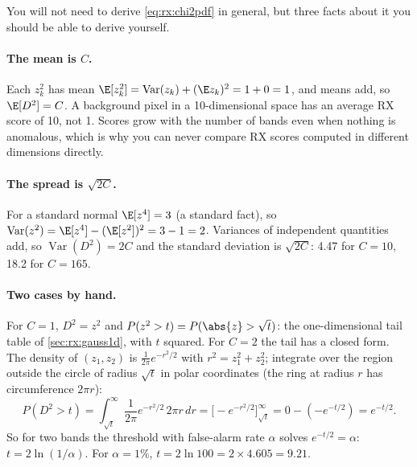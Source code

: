 You will not need to derive \cref{eq:rx:chi2pdf} in general, but three facts about it you should be
able to derive yourself.

\paragraph{The mean is $C$.} Each $z_k^2$ has mean $\E[z_k^2] = \operatorname{Var}(z_k) +
(\E z_k)^2 = 1 + 0 = 1$, and means add, so $\E[D^2] = C$. A background pixel in a 10-dimensional
space has an average RX score of 10, not 1. Scores grow with the number of bands even when nothing
is anomalous, which is why you can never compare RX scores computed in different dimensions
directly.

\paragraph{The spread is $\sqrt{2C}$.} For a standard normal $\E[z^4] = 3$ (a standard fact), so
$\operatorname{Var}(z^2) = \E[z^4] - (\E[z^2])^2 = 3 - 1 = 2$. Variances of independent quantities
add, so $\operatorname{Var}(D^2) = 2C$ and the standard deviation is $\sqrt{2C}$: 4.47 for
$C = 10$, 18.2 for $C = 165$.

\paragraph{Two cases by hand.} For $C = 1$, $D^2 = z^2$ and $P(z^2 > t) = P(\abs{z} > \sqrt t)$: the
one-dimensional tail table of \cref{sec:rx:gauss1d}, with $t$ squared. For $C = 2$ the tail has a
closed form. The density of $(z_1, z_2)$ is $\frac{1}{2\pi}e^{-r^2/2}$ with $r^2 = z_1^2 + z_2^2$;
integrate over the region outside the circle of radius $\sqrt t$ in polar coordinates (the ring at
radius $r$ has circumference $2\pi r$):
\[
P(D^2 > t) = \int_{\sqrt t}^{\infty}\frac{1}{2\pi}e^{-r^2/2}\,2\pi r\,dr
= \Big[-e^{-r^2/2}\Big]_{\sqrt t}^{\infty} = 0 - (-e^{-t/2}) = e^{-t/2}.
\]
So for two bands the threshold with false-alarm rate $\alpha$ solves $e^{-t/2} = \alpha$:
$t = 2\ln(1/\alpha)$. For $\alpha = 1\%$, $t = 2\ln 100 = 2\times4.605 = 9.21$.

